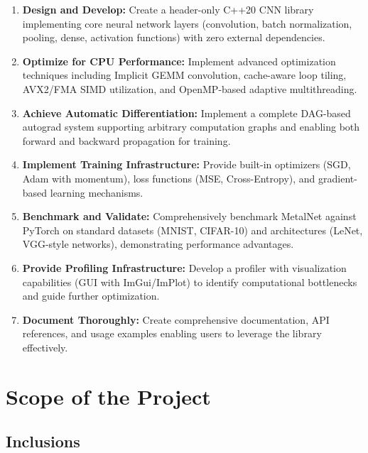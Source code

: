 \documentclass[12pt,oneside,a4paper]{report}
\begin{document}
\begin{enumerate}
    \item \textbf{Design and Develop:} Create a header-only C++20 CNN library implementing core neural network layers (convolution, batch normalization, pooling, dense, activation functions) with zero external dependencies.

    \item \textbf{Optimize for CPU Performance:} Implement advanced optimization techniques including Implicit GEMM convolution, cache-aware loop tiling, AVX2/FMA SIMD utilization, and OpenMP-based adaptive multithreading.

    \item \textbf{Achieve Automatic Differentiation:} Implement a complete DAG-based autograd system supporting arbitrary computation graphs and enabling both forward and backward propagation for training.

    \item \textbf{Implement Training Infrastructure:} Provide built-in optimizers (SGD, Adam with momentum), loss functions (MSE, Cross-Entropy), and gradient-based learning mechanisms.

    \item \textbf{Benchmark and Validate:} Comprehensively benchmark MetalNet against PyTorch on standard datasets (MNIST, CIFAR-10) and architectures (LeNet, VGG-style networks), demonstrating performance advantages.

    \item \textbf{Provide Profiling Infrastructure:} Develop a profiler with visualization capabilities (GUI with ImGui/ImPlot) to identify computational bottlenecks and guide further optimization.

    \item \textbf{Document Thoroughly:} Create comprehensive documentation, API references, and usage examples enabling users to leverage the library effectively.
\end{enumerate}

\section{Scope of the Project}

\subsection{Inclusions}
\end{document}
